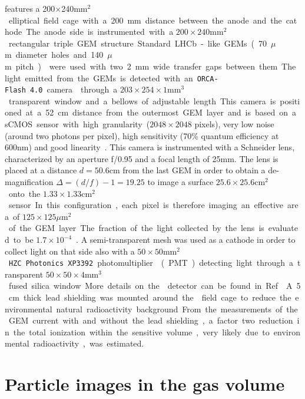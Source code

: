 \documentclass[12pt]{iopart}
\begin{document}
features a 200$\times$240\unit{mm$^2$} elliptical field cage with a
200 mm distance between the anode and the cathode. The anode side is
instrumented with a $200{\times}240$\unit{mm$^2$} rectangular triple
GEM structure.  Standard LHCb-like GEMs (70\unit{$\mu$m} diameter
holes and 140\unit{$\mu$m} pitch)~\cite{bib:thesis} were used with two
2\unit{mm} wide transfer gaps between them. The light emitted from the
GEMs is detected with an \texttt{ORCA-Flash~4.0} camera \cite{ORCAcamera}
through a $203{\times}254{\times}1$\unit{mm$^3$} transparent window
and a bellows of adjustable length.  This camera is positioned at a 52
cm distance from the outermost GEM layer and is based on a sCMOS
sensor with high granularity ($2048{\times}2048$ pixels), very low
noise (around two photons per pixel), high sensitivity (70\% quantum
efficiency at 600\unit{nm}) and good
linearity~\cite{bib:jinst_orange1}. This camera is instrumented with a
Schneider lens, characterized by an aperture f/0.95 and a focal length
of 25\unit{mm}. The lens is placed at a distance $d=50.6$\unit{cm}
from the last GEM in order to obtain a de-magnification $\Delta =
(d/f) - 1 = 19.25$ to image a surface $25.6{\times}25.6$\unit{cm$^2$}
onto the $1.33{\times}1.33$\unit{cm$^2$} sensor.  In this
configuration, each pixel is therefore imaging an effective area of
$125{\times}125$\unit{$\mu$m$^2$} of the GEM layer. The fraction of
the light collected by the lens is evaluated
to be $1.7{\times}10^{-4}$~\cite{bib:jinst_orange1}.
%
A semi-transparent mesh was used as a cathode in order to collect
light on that side also with a $50{\times}50$\unit{mm$^2$}
\texttt{HZC~Photonics~XP3392} photomultiplier~\cite{PMTPhotonics}
(PMT) detecting light through a transparent
$50{\times}50{\times}4$\unit{mm$^3$} fused silica window. More details
on the \lemon detector can be found in Ref.~\cite{paperBTF}.

A 5\unit{cm} thick lead shielding was mounted around the \lemon field
cage to reduce the environmental natural radioactivity
background. From the measurements of the GEM current with and without
the lead shielding, a factor two reduction in the total ionization
within the sensitive volume, very likely due to environmental
radioactivity, was estimated.


\section{Particle images in the \lemon gas volume}
\end{document}
